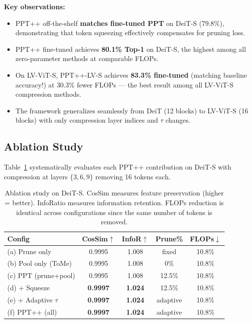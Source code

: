 \documentclass[10pt,twocolumn,letterpaper]{article}
\begin{document}
\textbf{Key observations:}
\begin{itemize}
\item PPT++ off-the-shelf \textbf{matches fine-tuned PPT} on DeiT-S (79.8\%),
demonstrating that token squeezing effectively compensates for pruning loss.
\item PPT++ fine-tuned achieves \textbf{80.1\% Top-1} on DeiT-S, the highest
among all zero-parameter methods at comparable FLOPs.
\item On LV-ViT-S, PPT++-LV-S achieves \textbf{83.3\% fine-tuned} (matching
baseline accuracy!) at 30.3\% fewer FLOPs --- the best result among all LV-ViT-S
compression methods.
\item The framework generalizes seamlessly from DeiT (12 blocks) to LV-ViT-S
(16 blocks) with only compression layer indices and $\tau$ changes.
\end{itemize}


\subsection{Ablation Study}

Table~\ref{tab:ablation} systematically evaluates each PPT++ contribution on
DeiT-S with compression at layers $\{3, 6, 9\}$ removing 16 tokens each.

\begin{table}[t]
\centering
\caption{Ablation study on DeiT-S. CosSim measures feature preservation
(higher = better). InfoRatio measures information retention. FLOPs reduction
is identical across configurations since the same number of tokens is removed.}
\label{tab:ablation}
\small
\begin{tabular}{lcccc}
\toprule
\textbf{Config} & \textbf{CosSim$\uparrow$} & \textbf{InfoR$\uparrow$} & \textbf{Prune\%} & \textbf{FLOPs$\downarrow$} \\
\midrule
(a) Prune only       & 0.9995 & 1.008 & fixed & 10.8\% \\
(b) Pool only (ToMe) & 0.9995 & 1.008 & 0\%   & 10.8\% \\
(c) PPT (prune+pool) & 0.9995 & 1.008 & 12.5\% & 10.8\% \\
\midrule
(d) + Squeeze        & \textbf{0.9997} & \textbf{1.024} & 12.5\% & 10.8\% \\
(e) + Adaptive $\tau$& \textbf{0.9997} & \textbf{1.024} & adaptive & 10.8\% \\
(f) PPT++ (all)      & \textbf{0.9997} & \textbf{1.024} & adaptive & 10.8\% \\
\bottomrule
\end{tabular}
\end{table}
\end{document}

